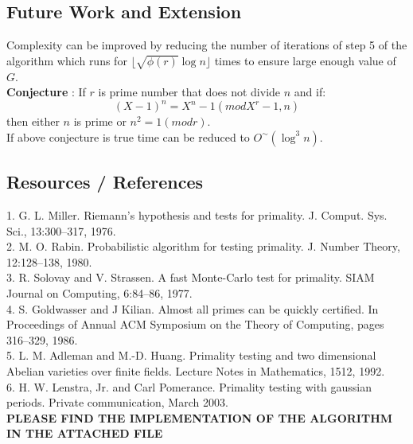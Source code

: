 \documentclass[10pt]{article}
\begin{document}
\subsection*{Future Work and Extension}
Complexity can be improved by reducing the number of iterations of step 5 of the algorithm which runs for $\lfloor \sqrt{\phi(r)}\log n \rfloor$ times to ensure large enough value of $G$.\\
{\bf Conjecture} : If $r$ is prime number that does not divide $n$ and if:
\[ (X-1)^n = X^n -1 (mod X^r -1,n)\]
then either $n$ is prime or $n^2 = 1 (mod r)$.\\ 
If above conjecture is true time can be reduced to $O^{\sim}(\log^3 n)$.\\

\subsection*{Resources / References}
1. G. L. Miller. Riemann’s hypothesis and tests for primality. J. Comput. Sys. Sci., 13:300–317, 1976.\\
2. M. O. Rabin. Probabilistic algorithm for testing primality. J. Number Theory, 12:128–138, 1980.\\
3. R. Solovay and V. Strassen. A fast Monte-Carlo test for primality. SIAM Journal on Computing, 6:84–86, 1977.\\
4. S. Goldwasser and J Kilian. Almost all primes can be quickly certified. In Proceedings of Annual ACM Symposium on the Theory of Computing, pages 316–329, 1986.\\
5. L. M. Adleman and M.-D. Huang. Primality testing and two dimensional Abelian varieties over finite fields. Lecture Notes in Mathematics, 1512, 1992.\\
6. H. W. Lenstra, Jr. and Carl Pomerance. Primality testing with gaussian periods. Private communication, March 2003.\\[15pt]
{\bf PLEASE FIND THE IMPLEMENTATION OF THE ALGORITHM IN THE ATTACHED FILE}
\end{document}
